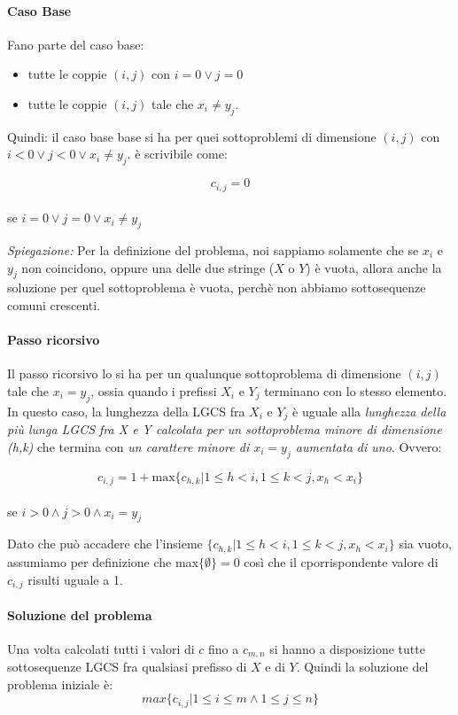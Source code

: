 \documentclass[12pt, a4paper, openany]{book}
\newcommand{\spiegazione}[1]{\begin{box_spiegazione} \small{ \emph{Spiegazione: }#1}\end{box_spiegazione}}
\begin{document}
\paragraph*{Caso Base}
Fano parte del caso base:
\begin{itemize}
	\item tutte le coppie $(i,j)$ con $i = 0 \vee j= 0$
	\item tutte le coppie $(i,j)$ tale che $x_i \neq y_j$.
\end{itemize}
Quindi: il caso base base si ha per quei sottoproblemi di dimensione $(i,j)$ con $i < 0 \vee j < 0 \vee x_i \neq y_j$.
è scrivibile come:
\begin{center}
	$$c_{i,j} = 0$$
	\\se $i=0 \vee j=0 \vee x_i \neq y_j$
\end{center}
\spiegazione{
	Per la definizione del problema, noi sappiamo solamente che se $x_i$ e $y_j$ non coincidono, oppure una delle due stringe ($X$ o $Y$) è vuota, allora anche la soluzione per quel sottoproblema è vuota,
	perchè non abbiamo sottosequenze comuni crescenti.
}

\paragraph*{Passo ricorsivo}
Il passo ricorsivo lo si ha per un qualunque sottoproblema di dimensione $(i,j)$ tale che $x_i = y_j$, ossia quando i prefissi $X_i$ e $Y_j$ terminano con lo stesso elemento.
\\In questo caso, la lunghezza della LGCS fra $X_i$ e $Y_j$ è uguale alla \emph{lunghezza della più lunga LGCS fra X e Y calcolata per un sottoproblema minore di dimensione (h,k)}
che termina con \emph{un carattere minore di $x_i = y_j$ aumentata di uno}.
Ovvero:

\begin{center}
	$$c_{i,j} = 1 + \text{max}\{c_{h,k} | 1 \leq h < i, 1 \leq k < j, x_h < x_i\}$$
	\\se $i>0\wedge j>0 \wedge x_i = y_j$
\end{center}

Dato che può accadere che l'insieme $\{c_{h,k} | 1 \leq h < i, 1 \leq k < j, x_h < x_i\}$ sia vuoto, assumiamo per definizione che max$\{\emptyset\} = 0$
così che il cporrispondente valore di $c_{i,j}$ risulti uguale a 1.

\paragraph*{Soluzione del problema}
Una volta calcolati tutti i valori di $c$ fino a $c_{m,n}$ si hanno a disposizione tutte sottosequenze LGCS fra qualsiasi prefisso di $X$ e di $Y$.
Quindi la soluzione del problema iniziale è:
\begin{equation*}
	max\{c_{i,j} | 1\leq i\leq m \wedge 1 \leq j \leq n \}
\end{equation*}
\end{document}
